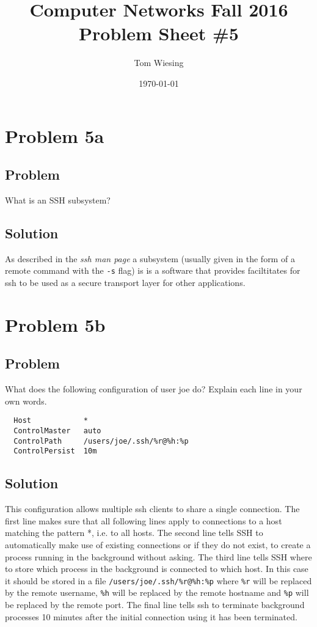 \documentclass[a4paper,10pt]{article}
\title{Computer Networks Fall 2016\\Problem Sheet \#5}
\author{Tom Wiesing}
\date{\today}
\begin{document}
\maketitle

\section{Problem 5a}

\subsection{Problem}
What is an SSH subsystem?

\subsection{Solution}
As described in the \textit{ssh man page} a subsystem (usually given in the form of a remote command with the \texttt{-s} flag) is is a software that provides faciltitates for ssh to be used as a secure transport layer for other applications.

\section{Problem 5b}

\subsection{Problem}

What does the following configuration of user joe do? Explain each line in your own words.
\begin{lstlisting}
  Host            *
  ControlMaster   auto
  ControlPath     /users/joe/.ssh/%r@%h:%p
  ControlPersist  10m
\end{lstlisting}

\subsection{Solution}

This configuration allows multiple ssh clients to share a single connection.
The first line makes sure that all following lines apply to connections to a host matching the pattern *, i.e. to all hosts.
The second line tells SSH to automatically make use of existing connections or if they do not exist, to create a process running in the background without asking.
The third line tells SSH where to store which process in the background is connected to which host.
In this case it should be stored in a file \lstinline{/users/joe/.ssh/%r@%h:%p} where \lstinline{%r} will be replaced by the remote username, \lstinline{%h} will be replaced by the remote hostname and \lstinline{%p} will be replaced by the remote port.
The final line tells ssh to terminate background processes 10 minutes after the initial connection using it has been terminated.
\end{document}
